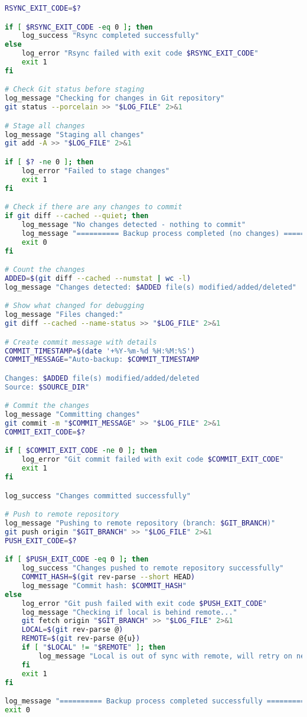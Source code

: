 \begin{lstlisting}[language=bash]
RSYNC_EXIT_CODE=$?

if [ $RSYNC_EXIT_CODE -eq 0 ]; then
    log_success "Rsync completed successfully"
else
    log_error "Rsync failed with exit code $RSYNC_EXIT_CODE"
    exit 1
fi

# Check Git status before staging
log_message "Checking for changes in Git repository"
git status --porcelain >> "$LOG_FILE" 2>&1

# Stage all changes
log_message "Staging all changes"
git add -A >> "$LOG_FILE" 2>&1

if [ $? -ne 0 ]; then
    log_error "Failed to stage changes"
    exit 1
fi

# Check if there are any changes to commit
if git diff --cached --quiet; then
    log_message "No changes detected - nothing to commit"
    log_message "========== Backup process completed (no changes) =========="
    exit 0
fi

# Count the changes
ADDED=$(git diff --cached --numstat | wc -l)
log_message "Changes detected: $ADDED file(s) modified/added/deleted"

# Show what changed for debugging
log_message "Files changed:"
git diff --cached --name-status >> "$LOG_FILE" 2>&1

# Create commit message with details
COMMIT_TIMESTAMP=$(date '+%Y-%m-%d %H:%M:%S')
COMMIT_MESSAGE="Auto-backup: $COMMIT_TIMESTAMP

Changes: $ADDED file(s) modified/added/deleted
Source: $SOURCE_DIR"

# Commit the changes
log_message "Committing changes"
git commit -m "$COMMIT_MESSAGE" >> "$LOG_FILE" 2>&1
COMMIT_EXIT_CODE=$?

if [ $COMMIT_EXIT_CODE -ne 0 ]; then
    log_error "Git commit failed with exit code $COMMIT_EXIT_CODE"
    exit 1
fi

log_success "Changes committed successfully"

# Push to remote repository
log_message "Pushing to remote repository (branch: $GIT_BRANCH)"
git push origin "$GIT_BRANCH" >> "$LOG_FILE" 2>&1
PUSH_EXIT_CODE=$?

if [ $PUSH_EXIT_CODE -eq 0 ]; then
    log_success "Changes pushed to remote repository successfully"
    COMMIT_HASH=$(git rev-parse --short HEAD)
    log_message "Commit hash: $COMMIT_HASH"
else
    log_error "Git push failed with exit code $PUSH_EXIT_CODE"
    log_message "Checking if local is behind remote..."
    git fetch origin "$GIT_BRANCH" >> "$LOG_FILE" 2>&1
    LOCAL=$(git rev-parse @)
    REMOTE=$(git rev-parse @{u})
    if [ "$LOCAL" != "$REMOTE" ]; then
        log_message "Local is out of sync with remote, will retry on next run"
    fi
    exit 1
fi

log_message "========== Backup process completed successfully =========="
exit 0
\end{lstlisting}

